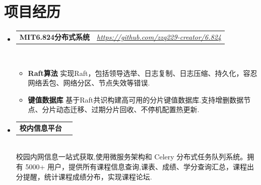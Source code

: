 \documentclass[letterpaper,11pt]{article}
\makeatletter
\newcommand{\resumeItem}[2]{
  \item\small{
    \textbf{#1}{ #2 \vspace{-2pt}}
  }
}
\newcommand{\resumeSubheadingtwo}[2]{
  \vspace{-1pt}\item
    \begin{tabular*}{0.97\textwidth}{l@{\extracolsep{\fill}}r}
      \textbf{#1} & \textit{ #2} \\
    \end{tabular*}\vspace{-5pt}
}
\newcommand{\resumeItemListStart}{\vspace{-10pt}\begin{itemize}}
\newcommand{\resumeItemListEnd}{\end{itemize}\vspace{-10pt}}
\makeatother
\begin{document}
\section{项目经历}
    \begin{itemize}[leftmargin=*,itemsep=5pt]
        \resumeSubheadingtwo
            {MIT6.824分布式系统}{\href{https://github.com/zzq229-creator/6.824}{https://github.com/zzq229-creator/6.824}}
            \\[7pt]
            \resumeItemListStart
                \resumeItem{Raft算法}
                    {实现Raft，包括领导选举、日志复制、日志压缩、持久化，容忍网络丢包、网络分区、节点失效等错误.}
                \resumeItem{键值数据库}
                    {基于Raft共识构建高可用的分片键值数据库.支持增删数据节点、分片动态迁移、过期分片回收、不停机配置热更新.
                    }
            \resumeItemListEnd

        \resumeSubheadingtwo
            {校内信息平台}{}{}
            \\[7pt]
            校园内网信息一站式获取,使用微服务架构和 Celery 分布式任务队列系统。拥有 5000+ 用户，提供所有课程信息查询,课表、成绩、学分查询汇总，课程出分提醒，统计课程成绩分布，实现课程论坛. 
    \end{itemize}
\end{document}
